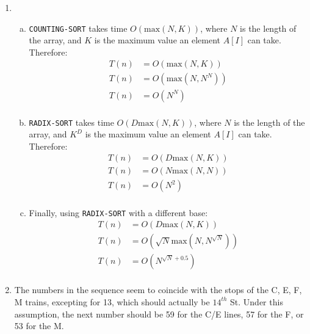 \documentclass{article}
\begin{document}
\begin{enumerate}[1.]
	\item
	    \begin{enumerate}[(a)]
	        \item \texttt{COUNTING-SORT} takes time $O(\text{max}(N, K))$, where $N$ is the length of the array, and $K$ is the maximum value an element $A[I]$ can take. Therefore:
	        \begin{align*}
	            T(n) &= O(\text{max}(N, K)) \\
	            T(n) &= O(\text{max}(N, N^N)) \\
	            T(n) &= O(N^N) \\
	        \end{align*}
	        \item \texttt{RADIX-SORT} takes time $O(D\text{max}(N, K))$, where $N$ is the length of the array, and $K^D$ is the maximum value an element $A[I]$ can take. Therefore:
	        \begin{align*}
	            T(n) &= O(D\text{max}(N, K)) \\
	            T(n) &= O(N\text{max}(N, N)) \\
	            T(n) &= O(N^2) \\
	        \end{align*}
	        \item Finally, using \texttt{RADIX-SORT} with a different base:
	        \begin{align*}
	            T(n) &= O(D\text{max}(N, K)) \\
	            T(n) &= O(\sqrt{N}\text{max}(N, N^{\sqrt{N}})) \\
	            T(n) &= O(N^{\sqrt{N} + 0.5}) \\
	        \end{align*}
	    \end{enumerate}
    \item The numbers in the sequence seem to coincide with the stops of the C, E, F, M trains, excepting for 13, which should actually be $14^{th}$ St. Under this assumption, the next number should be 59 for the C/E lines, 57 for the F, or 53 for the M.
    

\end{enumerate}
\end{document}
